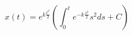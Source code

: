 \documentclass[]{scrartcl}
\begin{document}
$$
x(t) = e^{k\frac{t^2}{2}} \left( \int_{0}^{t} e^{-k\frac{s^2}{2}} s^2 ds + C \right)
$$







\end{document}

